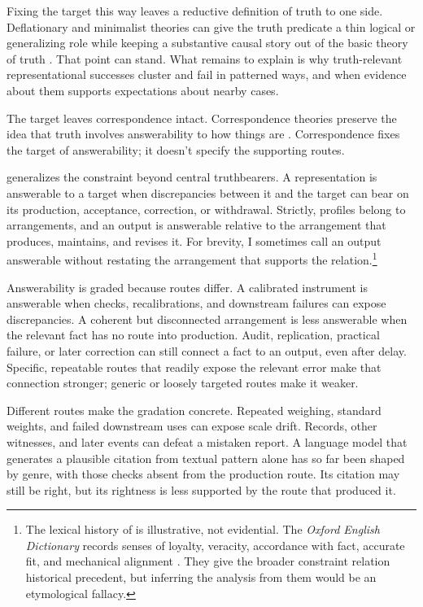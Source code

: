 \documentclass[12pt]{article}
\begin{document}
Fixing the target this way leaves a reductive definition of truth to one side.
Deflationary and minimalist theories can give the truth predicate a thin logical or
generalizing role while keeping a substantive causal story out of the basic theory of
truth \citep{horwich_1998_truth}. That point can stand. What remains to explain is why
truth-relevant representational successes cluster and fail in patterned ways, and when evidence
about them supports expectations about nearby cases.

The target leaves correspondence intact. Correspondence theories preserve the idea
that truth involves answerability to how things are
\citep{david_1994_correspondence_disquotation,kirkham_1992_theories_truth}. Correspondence
fixes the target of answerability; it doesn't specify the supporting routes.

 generalizes the constraint beyond central truthbearers. A
representation is answerable to a target when discrepancies between it and the target can
bear on its production, acceptance, correction, or withdrawal. Strictly, profiles belong to
arrangements, and an output is answerable relative to the arrangement that produces,
maintains, and revises it. For brevity, I sometimes call an output answerable without
restating the arrangement that supports the relation.\footnote{The
lexical history of  is illustrative, not evidential. The \textit{Oxford English
Dictionary} records senses of loyalty, veracity, accordance with fact, accurate fit, and
mechanical alignment \citep{oed_true_2026}. They give the broader constraint relation
historical precedent, but inferring the analysis from them would be an etymological fallacy.}

Answerability is graded because routes differ. A calibrated instrument is answerable when
checks, recalibrations, and downstream failures can expose discrepancies. A coherent but
disconnected arrangement is less answerable when the relevant fact has no route into
production. Audit, replication, practical failure, or later correction can still connect a
fact to an output, even after delay. Specific, repeatable routes that readily expose the
relevant error make that connection stronger; generic or loosely targeted routes make it
weaker.

Different routes make the gradation concrete. Repeated weighing, standard weights, and
failed downstream uses can expose scale drift. Records, other witnesses, and later events
can defeat a mistaken report. A language model that generates a plausible citation from textual
pattern alone has so far been shaped by genre, with those checks absent from the production
route. Its citation may still be right, but its rightness is less supported by the route
that produced it.
\end{document}
